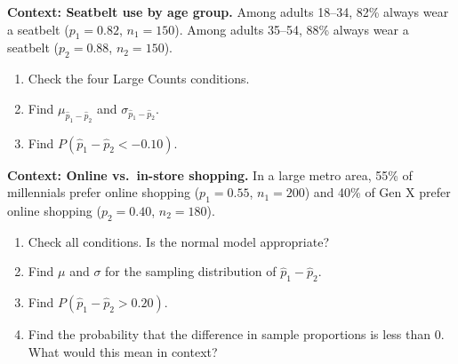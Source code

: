 \documentclass[10pt]{article}
\begin{document}
\namepartnerperiod

\vspace{0.1in}

\begin{tcolorbox}[colback=redbg, colframe=black!40, boxrule=0.6pt, arc=2mm,
    left=3mm, right=3mm, top=2mm, bottom=2mm, title=\textbf{Tier R --- Remediate}]
\textbf{Context: Seatbelt use by age group.}
Among adults 18--34, 82\% always wear a seatbelt ($p_1 = 0.82$, $n_1 = 150$).
Among adults 35--54, 88\% always wear a seatbelt ($p_2 = 0.88$, $n_2 = 150$).

\begin{enumerate}
  \item Check the four Large Counts conditions.
        \vspace{0.7in}
  \item Find $\mu_{\hat{p}_1-\hat{p}_2}$ and $\sigma_{\hat{p}_1-\hat{p}_2}$.
        \vspace{0.6in}
  \item Find $P(\hat{p}_1 - \hat{p}_2 < -0.10)$.
        \vspace{0.9in}
\end{enumerate}
\end{tcolorbox}

\vspace{0.12in}

\begin{tcolorbox}[colback=redbg, colframe=black!40, boxrule=0.6pt, arc=2mm,
    left=3mm, right=3mm, top=2mm, bottom=2mm, title=\textbf{Tier A --- Approaching Proficiency}]
\textbf{Context: Online vs.\ in-store shopping.}
In a large metro area, 55\% of millennials prefer online shopping ($p_1 = 0.55$,
$n_1 = 200$) and 40\% of Gen X prefer online shopping ($p_2 = 0.40$, $n_2 = 180$).

\begin{enumerate}
  \item Check all conditions. Is the normal model appropriate?
  \item Find $\mu$ and $\sigma$ for the sampling distribution of $\hat{p}_1 - \hat{p}_2$.
        \vspace{0.5in}
  \item Find $P(\hat{p}_1 - \hat{p}_2 > 0.20)$.
        \vspace{0.9in}
  \item Find the probability that the difference in sample proportions is less than 0.
        What would this mean in context?
        \vspace{0.9in}
\end{enumerate}
\end{tcolorbox}
\end{document}
